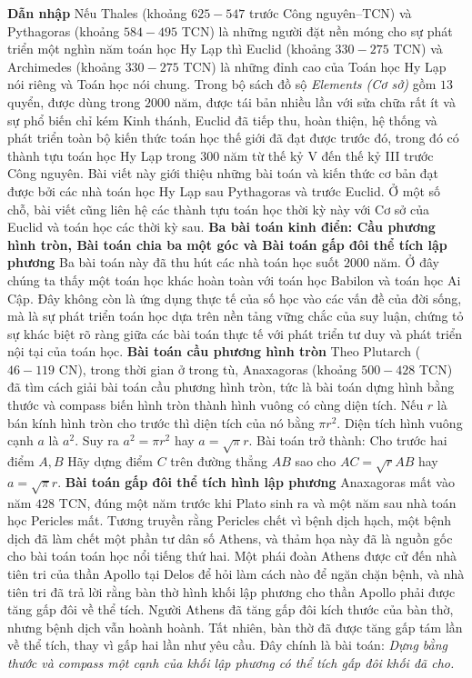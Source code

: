 \begin{multicols}{2}
	\textbf{\color{lichsutoanhoc}Dẫn nhập}
	\vskip 0.1cm
	Nếu Thales (khoảng $625-547$ trước Công nguyên--TCN) và Pythagoras (khoảng $584-495$ TCN) là những người đặt nền móng cho sự phát triển một nghìn năm toán học Hy Lạp thì Euclid (khoảng $330-275$ TCN) và Archimedes (khoảng $330-275$ TCN) là những đỉnh cao của Toán học Hy Lạp nói riêng và Toán học nói chung. Trong bộ sách đồ sộ \textit{Elements (Cơ sở)}  gồm $13$ quyển, được dùng trong $2000$ năm, được tái bản nhiều lần với sửa chữa rất ít và sự phổ biến chỉ kém Kinh thánh, Euclid đã tiếp thu, hoàn thiện, hệ thống và phát triển toàn bộ kiến thức toán học thế giới đã đạt được trước đó, trong đó có thành tựu toán học Hy Lạp trong 300 năm từ thế kỷ V đến thế kỷ III trước Công nguyên. 
	\vskip 0.1cm
	Bài viết này giới thiệu những bài toán và kiến thức cơ bản đạt được bởi các nhà toán học Hy Lạp sau Pythagoras và trước Euclid. Ở một số chỗ, bài viết cũng liên hệ các thành tựu toán học thời kỳ này với Cơ sở của Euclid và toán học các thời kỳ sau.    
	\vskip 0.1cm
	\textbf{\color{lichsutoanhoc}Ba bài toán kinh điển: Cầu phương hình tròn, Bài toán chia ba một góc và Bài toán gấp đôi thể tích lập phương}
	\vskip 0.1cm
	Ba bài toán này đã thu hút các nhà toán học suốt $2000$ năm. Ở đây chúng ta thấy một toán học khác hoàn toàn với toán học Babilon và toán học Ai Cập. Đây không còn là ứng dụng thực tế của số học vào các vấn đề của đời sống, mà là sự phát triển toán học dựa trên nền tảng vững chắc  của suy luận, chứng tỏ sự khác biệt rõ ràng giữa các bài toán thực tế với phát triển tư duy và phát triển nội tại của toán học.
	\vskip 0.1cm
	\textbf{\color{lichsutoanhoc}Bài toán cầu phương hình tròn}
	\vskip 0.1cm
	Theo Plutarch ($46-119$ CN), trong thời gian ở trong tù, Anaxagoras (khoảng $500-428$ TCN) đã tìm cách giải bài toán cầu phương hình tròn, tức là bài toán dựng hình bằng thước và compass biến hình tròn thành hình vuông có cùng diện tích. 
	\vskip 0.1cm
	Nếu $r$ là bán kính hình tròn cho trước thì diện tích của nó bằng $\pi r^2$. Diện tích hình vuông cạnh $a$  là $a^2$. Suy ra  $a^2 = \pi r^2$ hay  $a=\sqrt{\pi}r$. Bài toán trở thành: Cho trước hai điểm $A,B$ Hãy dựng điểm $C$  trên đường thẳng  $AB$  sao cho $AC = \sqrt{r}AB$  hay $a= \sqrt{\pi}r$.
	\vskip 0.1cm 
	\textbf{\color{lichsutoanhoc}Bài toán gấp đôi thể tích hình lập phương}
	\vskip 0.1cm
	Anaxagoras mất vào năm $428$ TCN, đúng một năm trước khi Plato sinh ra và một năm sau nhà toán học Pericles mất. Tương truyền rằng Pericles chết vì bệnh dịch hạch, một bệnh dịch đã làm chết một phần tư dân số Athens, và thảm họa này đã là nguồn gốc cho bài toán toán học nổi tiếng thứ hai. Một phái đoàn Athens được cử đến nhà tiên tri của thần Apollo tại Delos để hỏi làm cách nào để ngăn chặn bệnh, và nhà tiên tri đã trả lời rằng bàn thờ hình khối lập phương cho thần Apollo phải được tăng gấp đôi về thể tích. Người Athens đã tăng gấp đôi kích thước của bàn thờ, nhưng bệnh dịch vẫn hoành hoành. Tất nhiên, bàn thờ đã được tăng gấp tám lần về thể tích, thay vì gấp hai lần như yêu cầu. Đây chính là bài toán: \textit{Dựng bằng thước và compass một cạnh của khối lập phương có thể tích gấp đôi khối đã cho.}

\end{multicols}
